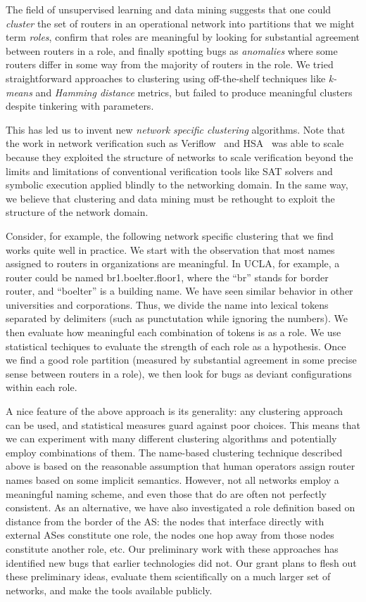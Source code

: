 The field of unsupervised learning and data mining suggests that one could {\em cluster} the set of routers in an operational network into partitions that we might term {\em roles}, confirm that roles are meaningful by looking for substantial agreement  between routers in a role, and finally spotting bugs as {\em anomalies} where some routers differ in some way from the majority of routers in the role.  We tried
straightforward approaches to clustering using off-the-shelf techniques like {\em k-means} and {\em Hamming distance} metrics, but failed to produce meaningful clusters despite tinkering with parameters.

This has led us to invent new {\em network specific clustering} algorithms. Note that the work in network verification such as Veriflow~\cite{veriflow}
and HSA~\cite{hsa} was able to scale because they exploited the structure of networks to scale verification beyond the limits and limitations of 
conventional verification tools like SAT solvers and symbolic execution applied blindly to the networking domain.  In the same way,
we believe that clustering and data mining must be rethought to exploit the structure of the network domain.

Consider, for example, the following network specific clustering that we find works quite well in practice.  We start with the
observation that most names assigned to routers in organizations are meaningful.  In UCLA, for example, a router
could be named br1.boelter.floor1, where the ``br'' stands for border router, and ``boelter'' is a building name. We have seen
similar behavior in other universities and corporations.  Thus, we divide the name into lexical tokens separated
by delimiters (such as punctutation while ignoring the numbers).  We then evaluate how meaningful each combination of tokens is as a role.  We use statistical techiques to evaluate the strength of each role as a hypothesis.  Once we find a good role partition (measured by substantial agreement in some precise sense between routers in a role), we then look for bugs as deviant configurations~\cite{engler} within each role.   

A nice feature of the above approach is its generality:  any clustering approach can be used, and statistical measures guard against poor choices.  This means that we can experiment with many different clustering algorithms and potentially employ combinations of them.  The name-based clustering technique described above is based on the reasonable assumption that human operators assign router names based on some implicit semantics.  However, not all networks employ a meaningful naming scheme, and even those that do are often not perfectly consistent.  As an alternative,
we have also investigated a role definition based on distance from the border of the AS: the nodes that interface directly with external ASes constitute one role, the nodes one hop away from those nodes constitute another role, etc.  
Our preliminary work with these approaches has identified new bugs that earlier technologies did not.  Our grant plans to flesh out these preliminary ideas, evaluate them scientifically on a much larger set of networks, and make the tools available publicly. 

